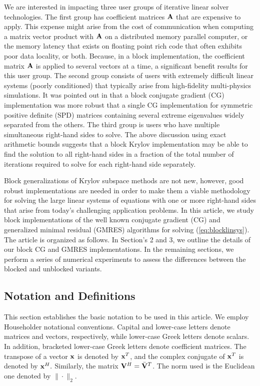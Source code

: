 \documentclass[twoside]{siamltex}
\newcommand{\bA}{{\bf A}}
\newcommand{\bV}{{\bf V}}
\begin{document}
We are interested in impacting three user groups of iterative
linear solver technologies. The first group has coefficient
matrices $\bA$ that are expensive to apply. This expense might
arise from the cost of communication when computing a matrix
vector product with $\bA$ on a distributed memory parallel
computer, or the memory latency that exists on floating point rich
code that often exhibits poor data locality, or both. Because, in
a block implementation, the coefficient matrix $\bA$ is applied to
several vectors at a time, a significant benefit results for this
user group. The second group consists of users with extremely
difficult linear systems (poorly conditioned) that typically arise
from high-fidelity multi-physics simulations. It was pointed out
in \cite{Ol80} that a block conjugate gradient (CG) implementation
was more robust that a single CG implementation for symmetric
positive definite (SPD) matrices containing several extreme
eigenvalues widely separated from the others. The third group is
users who have multiple simultaneous right-hand sides to solve.
The above discussion using exact arithmetic bounds suggests that a
block Krylov implementation may be able to find the solution to
all right-hand sides in a fraction of the total number of
iterations required to solve for each right-hand side separately.

Block generalizations of Krylov subspace methods are not new,
however, good robust implementations are needed in order to make
them a viable methodology for solving the large linear systems of
equations with one or more right-hand sides that arise from
today's challenging application problems. In this article, we
study block implementations of the well known conjugate gradient
(CG) \cite{HS52} and generalized minimal residual
(GMRES)\cite{SS86} algorithms for solving (\ref{eq:blocklinsys}).
The article is organized as follows.  In Section's 2 and 3, we
outline the details of our block CG and GMRES implementations. In
the remaining sections, we perform a series of numerical
experiments to assess the differences between the blocked and
unblocked variants.

\subsection{Notation and Definitions}
\label{notation_and_terminology}

This section establishes the basic notation to be used in this
article. We employ Householder notational conventions. Capital and
lower-case letters denote matrices and vectors, respectively,
while lower-case Greek letters denote scalars. In addition,
bracketed lower-case Greek letters denote coefficient matrices.
The transpose of a vector ${\bf x}$ is denoted by ${\bf x}^T$, and
the complex conjugate of ${\bf x}^T$ is denoted by ${\bf x}^H.$
Similarly, the matrix $\bV^H = {\bar \bV}^T$. The norm used is the
Euclidean one denoted by $\| \cdot \|_2.$
\end{document}
